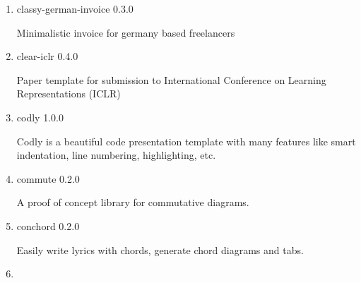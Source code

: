 \begin{enumerate}

  { charged-ieee } { 0.1.3 }

  An IEEE-style paper template to publish at conferences and journals
  for Electrical Engineering, Computer Science, and Computer Engineering

  { }
\item
  \href{/universe/package/classy-german-invoice/}{}


  { classy-german-invoice } { 0.3.0 }

  Minimalistic invoice for germany based freelancers

  { }
\item
  \href{/universe/package/clear-iclr/}{}


  { clear-iclr } { 0.4.0 }

  Paper template for submission to International Conference on Learning
  Representations (ICLR)

  { }
\item
  \href{/universe/package/codly/}{}

  { codly } { 1.0.0 }

  Codly is a beautiful code presentation template with many features
  like smart indentation, line numbering, highlighting, etc.

  { }
\item
  \href{/universe/package/commute/}{}

  { commute } { 0.2.0 }

  A proof of concept library for commutative diagrams.

  { }
\item
  \href{/universe/package/conchord/}{}

  { conchord } { 0.2.0 }

  Easily write lyrics with chords, generate chord diagrams and tabs.

  { }
\item
  \href{/universe/package/cram-snap/}{}



\end{enumerate}
